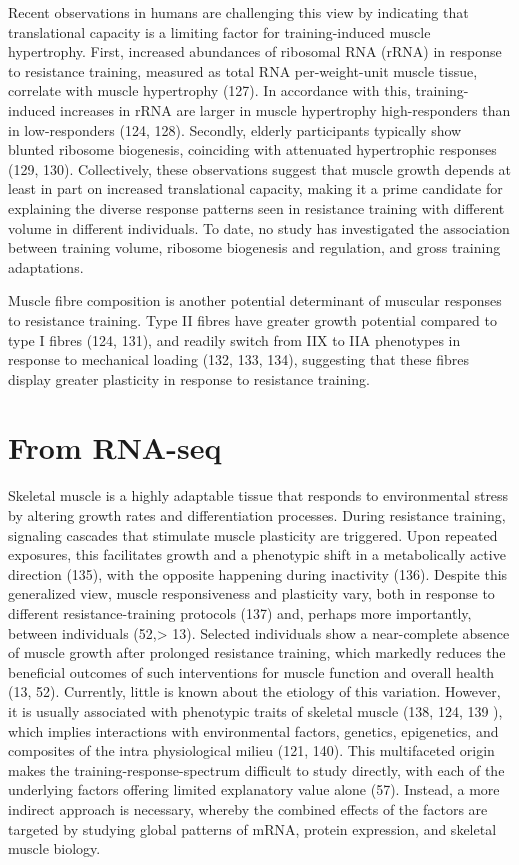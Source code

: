 \documentclass[twoside,10pt]{gihclass} %
\begin{document}
Recent observations in humans are challenging this view by indicating that translational capacity is a limiting factor for training-induced muscle hypertrophy. First, increased abundances of {ribosomal RNA (rRNA)} in response to resistance training, measured as total RNA per-weight-unit muscle tissue, correlate with muscle hypertrophy (127).
In accordance with this, training-induced increases in rRNA are larger in muscle hypertrophy high-responders than in low-responders
(124, 128).
Secondly, elderly participants typically show blunted ribosome biogenesis, coinciding with attenuated hypertrophic responses
(129, 130).
Collectively, these observations suggest that muscle growth depends at least in part on increased translational capacity, making it a prime candidate for explaining the diverse response patterns seen in resistance training with different volume in different individuals. To date, no study has investigated the association between training volume, ribosome biogenesis and regulation, and gross training adaptations.

Muscle fibre composition is another potential determinant of muscular responses to resistance training. Type II fibres have greater growth potential compared to type I fibres
(124, 131), and readily switch from IIX to IIA phenotypes in response to mechanical loading
(132, 133, 134),
suggesting that these fibres display greater plasticity in response to resistance training.

\hypertarget{from-rna-seq}{%
\section{From RNA-seq}\label{from-rna-seq}}

Skeletal muscle is a highly adaptable tissue that responds to environmental stress by altering growth rates and differentiation processes. During resistance training, signaling cascades that stimulate muscle plasticity are triggered. Upon repeated exposures, this facilitates growth and a phenotypic shift in a metabolically active direction (135),
with the opposite happening during inactivity (136).
Despite this generalized view, muscle responsiveness and plasticity vary, both in response to different resistance-training protocols (137) and, perhaps more importantly, between individuals (52,\textgreater{} 13).
Selected individuals show a near-complete absence of muscle growth after prolonged resistance training, which markedly reduces the beneficial outcomes of such interventions for muscle function and overall health (13, 52).
Currently, little is known about the etiology of this variation. However, it is usually associated with phenotypic traits of skeletal muscle (138, 124, 139 ), which implies interactions with environmental factors, genetics, epigenetics, and composites of the intra physiological milieu (121, 140).
This multifaceted origin makes the training-response-spectrum difficult to study directly, with each of the underlying factors offering limited explanatory value alone (57).
Instead, a more indirect approach is necessary, whereby the combined effects of the factors are targeted by studying global patterns of mRNA, protein expression, and skeletal muscle biology.
\end{document}
